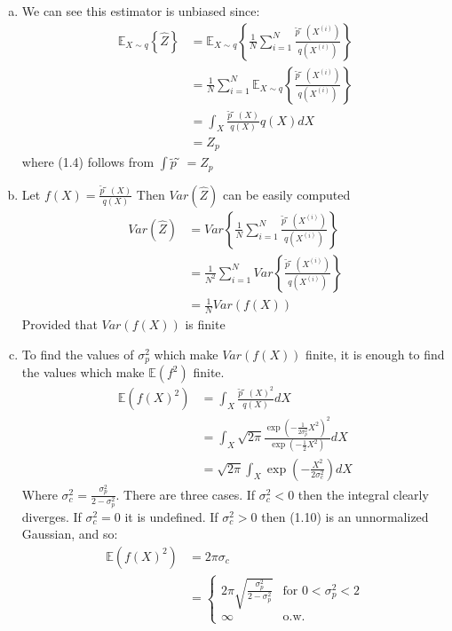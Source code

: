 \documentclass[paper=a4, fontsize=11pt]{scrartcl} %
\numberwithin{equation}{section} %
\numberwithin{figure}{section} %
\numberwithin{table}{section} %
\begin{document}
\begin{enumerate}[(a)]
	\item We can see this estimator is unbiased since:
	\begin{align}
	\mathbb{E}_{X\sim q}\left\{\hat{Z}\right\}&=\mathbb{E}_{X\sim q}\left\{ \frac{1}{N}\sum_{i=1}^N \frac{\tilde{p}̃(X^{(i)})}{q(X^{(i)})} \right\} \\
	&=\frac{1}{N}\sum_{i=1}^N \mathbb{E}_{X\sim q}\left\{ \frac{\tilde{p}̃(X^{(i)})}{q(X^{(i)})} \right\} \\
	&= \int_X \frac{\tilde{p}̃(X)}{q(X)}q(X)dX \\
	&= Z_p
	\end{align}
	where (1.4) follows from $\int \tilde{p}̃ = Z_p$
	\item Let $f(X)=\frac{\tilde{p}̃(X)}{q(X)}$ Then $Var(\hat{Z})$ can be easily computed
	\begin{align}
	Var(\hat{Z}) &= Var\left\{\frac{1}{N}\sum_{i=1}^N \frac{\tilde{p}̃(X^{(i)})}{q(X^{(i)})}\right\}\\
	&= \frac{1}{N^2}\sum_{i=1}^N Var \left\{\frac{\tilde{p}̃(X^{(i)})}{q(X^{(i)})}\right\}\\
	&=\frac{1}{N}Var(f(X))
	\end{align}
	Provided that $Var(f(X))$ is finite
	\item To find the values of $\sigma^2_p$ which make $Var(f(X))$ finite, it is enough to find the values which make $\mathbb{E}(f^2)$ finite.
	\begin{align}
	\mathbb{E}(f(X)^2) &= \int_X \frac{\tilde{p}̃(X)^2}{q(X)}dX\\
	&= \int_X \sqrt{2\pi}\frac{\exp\left(-\frac{1}{2\sigma_p^2} X^2\right)^2}{\exp\left(-\frac{1}{2} X^2\right)} dX \\
	&= \sqrt{2\pi}\int_X\exp\left(-\frac{X^2}{2\sigma_c^2}\right) dX
	\end{align}
	Where $\sigma_c^2=\frac{\sigma_p^2}{2-\sigma_p^2}$. There are three cases. If $\sigma_c^2<0$ then the integral clearly diverges. If $\sigma_c^2=0$ it is undefined. If $\sigma_c^2>0$ then (1.10) is an unnormalized Gaussian, and so:
	\begin{align}
	\mathbb{E}(f(X)^2) &= 2\pi\sigma_c \\
	&= \begin{cases}2\pi\sqrt{\frac{\sigma_p^2}{2-\sigma_p^2}} & \text{for } 0 < \sigma_p^2 < 2\\
	\infty & \text{o.w.}
	\end{cases}
	\end{align}
\end{enumerate}
\end{document}
